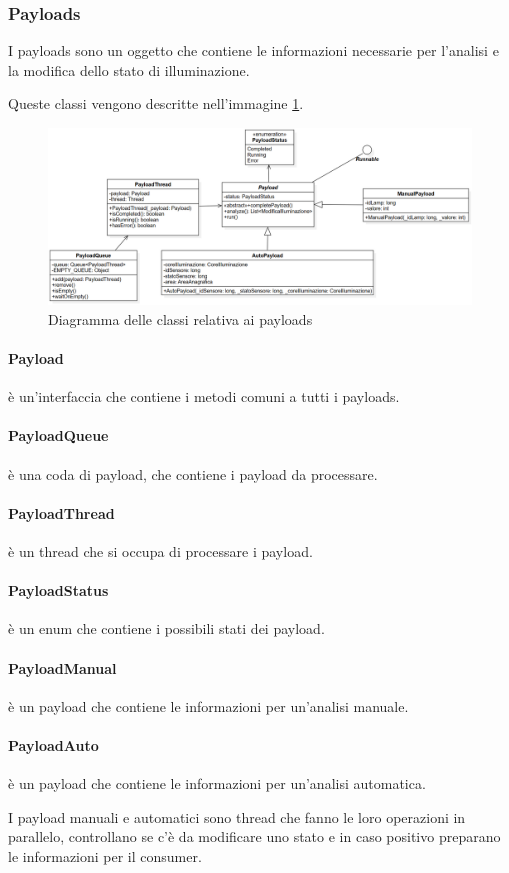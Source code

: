 \subsubsection{Payloads}

I payloads sono un oggetto che contiene le informazioni necessarie per l'analisi e la modifica dello stato di illuminazione.

Queste classi vengono descritte nell'immagine \ref{fig:coordinazione_payload}.

\begin{figure}[h]
    \centering
    \includegraphics[width=\textwidth]{img/illuminazione_payload.png}
    \caption{Diagramma delle classi relativa ai payloads}
    \label{fig:coordinazione_payload}
\end{figure}

\paragraph{Payload} è un'interfaccia che contiene i metodi comuni a tutti i payloads.

\paragraph{PayloadQueue} è una coda di payload, che contiene i payload da processare.

\paragraph{PayloadThread} è un thread che si occupa di processare i payload.

\paragraph{PayloadStatus} è un enum che contiene i possibili stati dei payload.

\paragraph{PayloadManual} è un payload che contiene le informazioni per un'analisi manuale.

\paragraph{PayloadAuto} è un payload che contiene le informazioni per un'analisi automatica.

I payload manuali e automatici sono thread che fanno le loro operazioni in parallelo, controllano se c'è da modificare uno stato e in caso positivo preparano le informazioni per il consumer.
